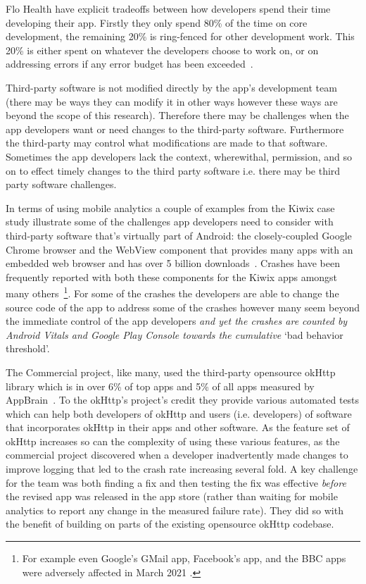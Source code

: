 Flo Health have explicit tradeoffs between how developers spend their time developing their app. Firstly they only spend 80\% of the time on core development, the remaining 20\% is ring-fenced for other development work. This 20\% is either spent on whatever the developers choose to work on, or on addressing errors if any error budget has been exceeded~\citep{koutun2021_how_to_deal_with_tech_debt_at_the_scale_of_super_app}.


Third-party software is not modified directly by the app's development team (there may be ways they can modify it in other ways however these ways are beyond the scope of this research). Therefore there may be challenges when the app developers want or need changes to the third-party software. Furthermore the third-party may control what modifications are made to that software. Sometimes the app developers lack the context, wherewithal, permission, and so on to effect timely changes to the third party software i.e. there may be third party software challenges.

In terms of using mobile analytics a couple of examples from the Kiwix case study illustrate some of the challenges app developers need to consider with third-party software that's virtually part of Android: the closely-coupled Google Chrome browser and the WebView component that provides many apps with an embedded web browser and has over 5 billion downloads~\citep{android_webview_app_2022}. Crashes have been frequently reported with both these components for the Kiwix apps amongst many others~\footnote{For example even Google's GMail app, Facebook's app, and the BBC apps were adversely affected in March 2021 \citep{bbcnews2021_google_fixes_crashing_android_app_issues}.}. For some of the crashes the developers are able to change the source code of the app to address some of the crashes however many seem beyond the immediate control of the app developers \emph{and yet the crashes are counted by Android Vitals and Google Play Console towards the cumulative} `bad behavior threshold'. 

The Commercial project, like many, used the third-party opensource okHttp library which is in over 6\% of top apps and 5\% of all apps measured by AppBrain~\citep{appbrain2022_ok_http_stats}.
%
To the okHttp's project's credit they provide various automated tests which can help both developers of okHttp and users (i.e. developers) of software that incorporates okHttp in their apps and other software. As the feature set of okHttp increases so can the complexity of using these various features, as the commercial project discovered when a developer inadvertently made changes to improve logging that led to the crash rate increasing several fold. A key challenge for the team was both finding a fix and then testing the fix was effective \emph{before} the revised app was released in the app store (rather than waiting for mobile analytics to report any change in the measured failure rate). They did so with the benefit of building on parts of the existing opensource okHttp codebase.

